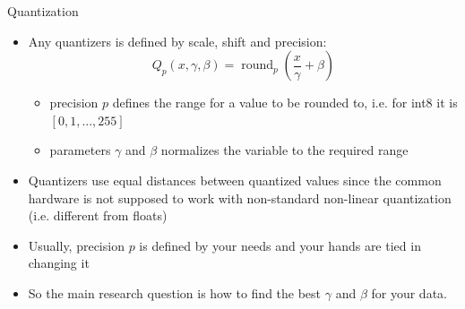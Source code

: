 \documentclass[10pt, handout]{beamer}
\begin{document}
\begin{frame}{Quantization}
    \begin{itemize}
        \pause\item Any quantizers is defined by scale, shift and precision:
        \begin{equation}
            Q_p(x, \gamma, \beta) = \operatorname{round}_p\left( \frac{x}{\gamma} + \beta \right) 
        \end{equation}
        \begin{itemize}
            \item\pause precision $p$ defines the range for a value to be rounded to, i.e. for int8 it is $[0, 1, ..., 255]$
            \item\pause parameters $\gamma$ and $\beta$ normalizes the variable to the required range
        \end{itemize}
        \pause\item Quantizers use equal distances between quantized values since the common hardware is not supposed to work with non-standard non-linear quantization (i.e. different from floats)
        \pause\item Usually, precision $p$ is defined by your needs and your hands are tied in changing it
        \pause\item So the main research question is how to find the best $\gamma$ and $\beta$ for your data.
    \end{itemize}
\end{frame}
\end{document}
